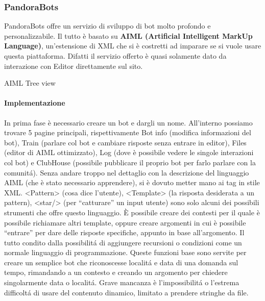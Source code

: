 \documentclass[]{article}
\begin{document}
\subsubsection{PandoraBots}
PandoraBots offre un servizio di sviluppo di bot molto profondo e personalizzabile. Il tutto è basato su \textbf{AIML (Artificial Intelligent MarkUp Language)}, un’estensione di XML che si è costretti ad imparare se si vuole usare questa piattaforma. Difatti il servizio offerto è quasi solamente dato da interazione con Editor direttamente sul sito. 
\begin{center}
\footnotesize{AIML Tree view }
\end{center}
\paragraph{Implementazione}
In prima fase è necessario creare un bot e dargli un nome. All’interno possiamo trovare 5 pagine principali, rispettivamente Bot info (modifica informazioni del bot), Train (parlare col bot e cambiare risposte senza entrare in editor), Files (editor di AIML ottimizzato), Log (dove è possibile vedere le singole interazioni col bot) e ClubHouse (possibile pubblicare il proprio bot per farlo parlare con la comunitá). 
Senza andare troppo nel dettaglio con la descrizione del linguaggio AIML (che è stato necessario apprendere), si è dovuto metter mano ai tag in stile XML. <Pattern> (cosa dice l’utente), <Template> (la risposta desiderata a un pattern), <star/> (per “catturare” un input utente) sono solo alcuni dei possibili strumenti che offre questo linguaggio. È possibile creare dei contesti per il quale è possibile richiamare altri template, oppure creare argomenti in cui è possibile “entrare” per dare delle risposte specifiche, appunto in base all’argomento. Il tutto condito dalla possibilitá di aggiungere recursioni o condizioni come un normale linguaggio di programmazione. Queste funzioni base sono servite per creare un semplice bot che riconoscesse localitá e data di una domanda sul tempo, rimandando a un contesto e creando un argomento per chiedere singolarmente data o localitá. Grave mancanza è l’impossibilitá o l’estrema difficoltá di usare del contenuto dinamico, limitato a prendere stringhe da file. 
\end{document}

